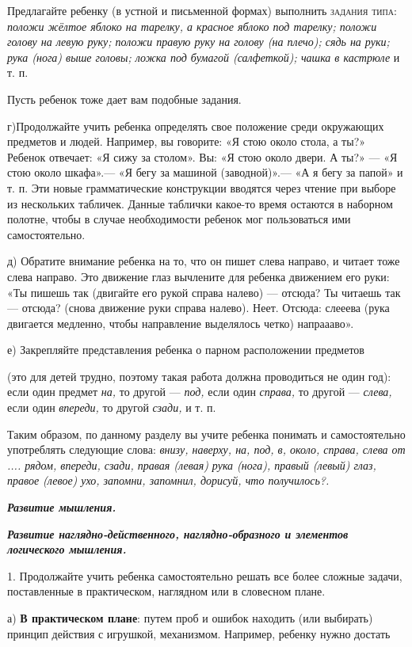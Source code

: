 \documentclass[a5paper]{book}
\renewcommand{\emph}[1]{\textit{#1}}
\begin{document}
Предлагайте ребенку (в устной и письменной формах) выполнить
\textsc{задания типа:} \emph{положи жёлтое яблоко на тарелку, а красное
яблоко под тарелку; положи голову на левую руку; положи правую руку на
голову (на плечо); сядь на руки; рука (нога) выше головы; ложка под
бумагой (салфеткой); чашка в кастрюле} и т. п.

Пусть ребенок тоже дает вам подобные задания.

г)Продолжайте учить ребенка определять свое положение среди окружающих
предметов и людей. Например, вы говорите: «Я стою около стола, а ты?»
Ребенок отвечает: «Я сижу за столом». Вы: «Я стою около двери. А ты?»
--- «Я стою около шкафа».--- «Я бегу за машиной (заводной)».--- «А я
бегу за папой» и т. п. Эти новые грамматические конструкции вводятся
через чтение при выборе из нескольких табличек. Данные таблички какое-то
время остаются в наборном полотне, чтобы в случае необходимости ребенок
мог пользоваться ими самостоятельно.

д) Обратите внимание ребенка на то, что он пишет слева направо, и читает
тоже слева направо. Это движение глаз вычлените для ребенка движением
его руки: «Ты пишешь так (двигайте его рукой справа налево) --- отсюда?
Ты читаешь так --- отсюда? (снова движение руки справа налево). Неет.
Отсюда: слееева (рука двигается медленно, чтобы направление выделялось
четко) напраааво».

е) Закрепляйте представления ребенка о парном расположении предметов

(это для детей трудно, поэтому такая работа должна проводиться не один
год): если один предмет \emph{на,} то другой --- \emph{под,} если один
\emph{справа,} то другой --- \emph{слева,} если один \emph{впереди,} то
другой \emph{сзади,} и т. п.

Таким образом, по данному разделу вы учите ребенка понимать и
самостоятельно употреблять следующие слова: \emph{внизу, наверху, на,
под, в, около, справа, слева от .... рядом, впереди, сзади, правая
(левая) рука (нога), правый (левый) глаз, правое (левое) ухо, запомни,
запомнил, дорисуй, что получилось?.}

\emph{\textbf{Развитие мышления.}}

\emph{\textbf{Развитие наглядно-действенного, наглядно-образного и
элементов логического мышления.}}

1. Продолжайте учить ребенка самостоятельно решать все более сложные
задачи, поставленные в практическом, наглядном или в словесном плане.

а) \textbf{В практическом плане}: путем проб и ошибок находить (или
выбирать) принцип действия с игрушкой, механизмом. Например, ребенку
нужно достать
\end{document}
